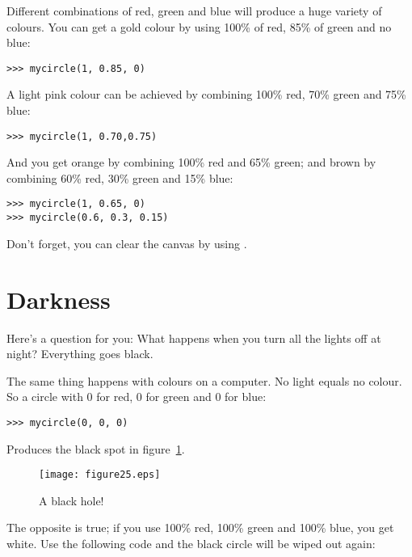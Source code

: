 \noindent
Different combinations of red, green and blue will produce a huge variety of colours.  You can get a gold colour by using 100\% of red, 85\% of green and no blue:

\begin{Verbatim}[frame=single]
>>> mycircle(1, 0.85, 0)
\end{Verbatim}

\noindent
A light pink colour can be achieved by combining 100\% red, 70\% green and 75\% blue:

\begin{Verbatim}[frame=single]
>>> mycircle(1, 0.70,0.75)
\end{Verbatim}

\noindent
And you get orange by combining 100\% red and 65\% green; and brown by combining 60\% red, 30\% green and 15\% blue:

\begin{Verbatim}[frame=single]
>>> mycircle(1, 0.65, 0)
>>> mycircle(0.6, 0.3, 0.15)
\end{Verbatim}

\noindent
Don't forget, you can clear the canvas by using .

\section{Darkness}

Here's a question for you:  What happens when you turn all the lights off at night? Everything goes black.
\par
The same thing happens with colours on a computer.  No light equals no colour.  So a circle with 0 for red, 0 for green and 0 for blue:

\begin{Verbatim}[frame=single]
>>> mycircle(0, 0, 0)
\end{Verbatim}

Produces the black spot in figure~\ref{fig25}.

\begin{figure}
\begin{center}
\texttt{[image: figure25.eps]}
\end{center}
\caption{A black hole!}\label{fig25}
\end{figure}

The opposite is true; if you use 100\% red, 100\% green and 100\% blue, you get white.  Use the following code and the black circle will be wiped out again:


